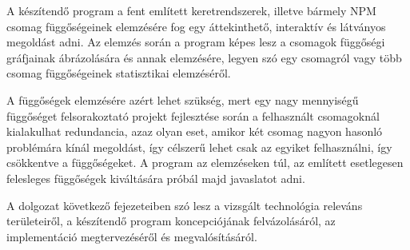 A készítendő program a fent említett keretrendszerek, illetve bármely NPM csomag függőségeinek elemzésére fog egy áttekinthető, interaktív és látványos megoldást adni. Az elemzés során a program képes lesz a csomagok függőségi gráfjainak ábrázolására és annak elemzésére, legyen szó egy csomagról vagy több csomag függőségeinek statisztikai elemzéséről.

A függőségek elemzésére azért lehet szükség, mert egy nagy mennyiségű függőséget felsorakoztató projekt fejlesztése során a felhasznált csomagoknál kialakulhat redundancia, azaz olyan eset, amikor két csomag nagyon hasonló problémára kínál megoldást, így célszerű lehet csak az egyiket felhasználni, így csökkentve a függőségeket. A program az elemzéseken túl, az említett esetlegesen felesleges függőségek kiváltására próbál majd javaslatot adni.

A dolgozat következő fejezeteiben szó lesz a vizsgált technológia releváns területeiről, a készítendő program koncepciójának felvázolásáról, az implementáció megtervezéséről és megvalósításáról.
